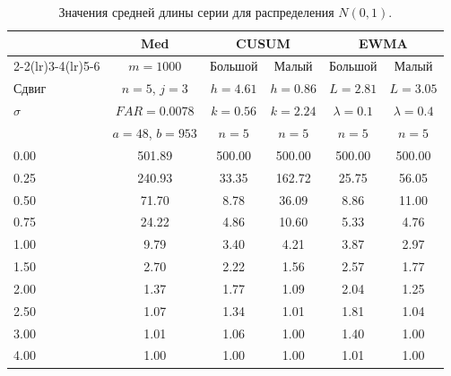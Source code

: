 \begin{table}[!ht]
	\centering
	\caption{Значения средней длины серии для распределения \(N(0, 1)\).}
	\label{tab:4.20a}
	\small
	\begin{tabular}{@{}lccccc@{}}
		\toprule
		& Med & \multicolumn{2}{c}{CUSUM} & \multicolumn{2}{c}{EWMA} \\
		\cmidrule(lr){2-2}\cmidrule(lr){3-4}\cmidrule(lr){5-6}
		& \(m = 1000\) & Большой & Малый & Большой & Малый \\
		Сдвиг & \(n = 5\), \(j = 3\) & \(h = 4.61\) & \(h = 0.86\) & \(L = 2.81\) & \(L = 3.05\) \\
		\(\sigma\) & \(FAR = 0.0078\) & \(k = 0.56\) & \(k = 2.24\) & \(\lambda = 0.1\) & \(\lambda = 0.4\) \\
		& \(a = 48\), \(b = 953\) & \(n = 5\) & \(n = 5\) & \(n = 5\) & \(n = 5\) \\
		\midrule
		0.00 & 501.89 & 500.00 & 500.00 & 500.00 & 500.00 \\
		0.25 & 240.93 & 33.35 & 162.72 & 25.75 & 56.05 \\
		0.50 & 71.70 & 8.78 & 36.09 & 8.86 & 11.00 \\
		0.75 & 24.22 & 4.86 & 10.60 & 5.33 & 4.76 \\
		1.00 & 9.79 & 3.40 & 4.21 & 3.87 & 2.97 \\
		1.50 & 2.70 & 2.22 & 1.56 & 2.57 & 1.77 \\
		2.00 & 1.37 & 1.77 & 1.09 & 2.04 & 1.25 \\
		2.50 & 1.07 & 1.34 & 1.01 & 1.81 & 1.04 \\
		3.00 & 1.01 & 1.06 & 1.00 & 1.40 & 1.00 \\
		4.00 & 1.00 & 1.00 & 1.00 & 1.01 & 1.00 \\
		\bottomrule
	\end{tabular}
\end{table}


